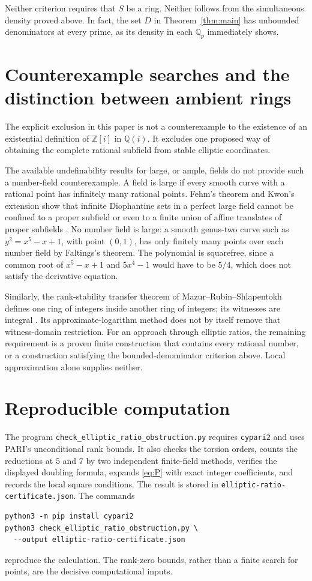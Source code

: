 \documentclass[11pt,a4paper]{article}
\theoremstyle{definition}
\newcommand{\Q}{\mathbb Q}\newcommand{\Z}{\mathbb Z}
\begin{document}
Neither criterion requires that $S$ be a ring. Neither follows from
the simultaneous density proved above. In fact, the set $D$ in
Theorem~\ref{thm:main} has unbounded denominators at every prime,
as its density in each $\Q_p$ immediately shows.

\section{Counterexample searches and the distinction between ambient rings}

The explicit exclusion in this paper is not a counterexample to
the existence of an existential definition of $\Z[i]$ in $\Q(i)$.
It excludes one proposed way of obtaining the complete rational
subfield from stable elliptic coordinates.

The available undefinability results for large, or ample, fields
do not provide such a number-field counterexample. A field is
large if every smooth curve with a rational point has infinitely
many rational points. Fehm's theorem and Kwon's extension show
that infinite Diophantine sets in a perfect large field cannot
be confined to a proper subfield or even to a finite union of
affine translates of proper subfields \cite{Fehm,Kwon}.
No number field is large: a smooth genus-two curve such as
$y^2=x^5-x+1$, with point $(0,1)$, has only finitely many points
over each number field by Faltings's theorem. The polynomial is
squarefree, since a common root of $x^5-x+1$ and $5x^4-1$
would have to be $5/4$, which does not satisfy the derivative
equation.

Similarly, the rank-stability transfer theorem of
Mazur--Rubin--Shlapentokh defines one ring of integers inside
another ring of integers; its witnesses are integral
\cite[Theorem 1.1 and Section 14]{MRS}. Its approximate-logarithm
method does not by itself remove that witness-domain restriction.
For an approach through elliptic ratios, the remaining requirement
is a proven finite construction that contains every rational
number, or a construction satisfying the bounded-denominator
criterion above. Local approximation alone supplies neither.

\section{Reproducible computation}

The program \nolinkurl{check_elliptic_ratio_obstruction.py} requires
\texttt{cypari2} and uses PARI's unconditional rank bounds. It also
checks the torsion orders, counts the reductions at $5$ and $7$
by two independent finite-field methods, verifies the displayed
doubling formula, expands \eqref{eq:P} with exact integer
coefficients, and records the local square conditions.
The result is stored in
\nolinkurl{elliptic-ratio-certificate.json}.
The commands
\begin{verbatim}
python3 -m pip install cypari2
python3 check_elliptic_ratio_obstruction.py \
  --output elliptic-ratio-certificate.json
\end{verbatim}
reproduce the calculation. The rank-zero bounds, rather than a
finite search for points, are the decisive computational inputs.
\end{document}
